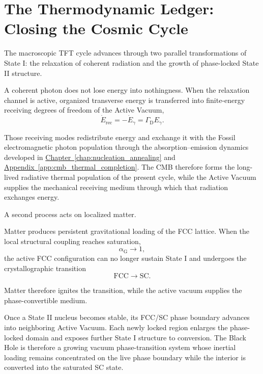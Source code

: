 \section{The Thermodynamic Ledger: Closing the Cosmic Cycle}
\label{sec:thermodynamic_ledger}

The macroscopic TFT cycle advances through two parallel transformations of State I: the relaxation of coherent radiation and the growth of phase-locked State II structure.

A coherent photon does not lose energy into nothingness. When the relaxation channel is active, organized transverse energy is transferred into finite-energy receiving degrees of freedom of the Active Vacuum,
\begin{equation}
    \dot E_{\mathrm{rec}}
    =
    -\dot E_\gamma
    =
    \Gamma_{\mathrm D}E_\gamma.
\end{equation}

Those receiving modes redistribute energy and exchange it with the Fossil electromagnetic photon population through the absorption--emission dynamics developed in \hyperref[chap:nucleation_annealing]{Chapter~\ref*{chap:nucleation_annealing}} and \hyperref[app:cmb_thermal_completion]{Appendix~\ref*{app:cmb_thermal_completion}}. The CMB therefore forms the long-lived radiative thermal population of the present cycle, while the Active Vacuum supplies the mechanical receiving medium through which that radiation exchanges energy.

A second process acts on localized matter.

Matter produces persistent gravitational loading of the FCC lattice. When the local structural coupling reaches saturation,
\begin{equation}
    \alpha_{\mathrm G}
    \rightarrow
    1,
\end{equation}
the active FCC configuration can no longer sustain State I and undergoes the crystallographic transition
\begin{equation}
    \mathrm{FCC}
    \longrightarrow
    \mathrm{SC}.
\end{equation}

Matter therefore ignites the transition, while the active vacuum supplies the phase-convertible medium.

Once a State II nucleus becomes stable, its FCC/SC phase boundary advances into neighboring Active Vacuum. Each newly locked region enlarges the phase-locked domain and exposes further State I structure to conversion. The Black Hole is therefore a growing vacuum phase-transition system whose inertial loading remains concentrated on the live phase boundary while the interior is converted into the saturated SC state.

